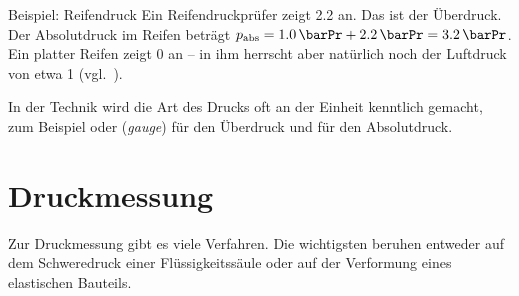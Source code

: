 \begin{examplebox}[]{Beispiel: Reifendruck}
    Ein Reifendruckprüfer zeigt \SI{2.2}{\barPr} an. Das ist der Überdruck. Der Absolutdruck im Reifen beträgt $p_\text{abs} = \SI{1.0}{\barPr} + \SI{2.2}{\barPr} = \SI{3.2}{\barPr}$. Ein platter Reifen zeigt \SI{0}{\barPr} an -- in ihm herrscht aber natürlich noch der Luftdruck von etwa \SI{1}{\barPr} (vgl.~\cite[S.~456]{Giancoli2010}).
\end{examplebox}
In der Technik wird die Art des Drucks oft an der Einheit kenntlich gemacht, zum Beispiel  oder  (\textit{gauge}) für den Überdruck und  für den Absolutdruck.

\section{Druckmessung}\label{sec: druckmessung}
Zur Druckmessung gibt es viele Verfahren. Die wichtigsten beruhen entweder auf dem Schweredruck einer Flüssigkeitssäule oder auf der Verformung eines elastischen Bauteils.

